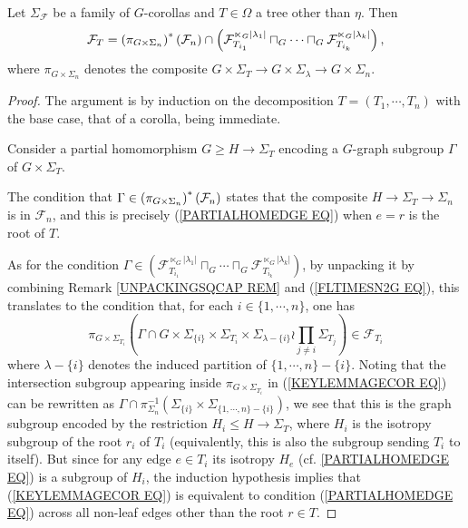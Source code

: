 \documentclass[a4paper,10pt]{article}%
\begin{document}
\begin{lemma}\label{KEYLEMMAGECO LEM}
  Let $\Sigma_\mathcal{F}$ be a family of $G$-corollas and 
  $T \in \Omega$ a tree other than $\eta$. Then
  \begin{equation}\label{KEYLEMMAGECO EQ}
    \mathcal{F}_T =
    \left(\pi_{G \times \Sigma_n}\right)^{\**}(\mathcal{F}_n)
    \cap
    \left(
      \mathcal{F}_{T_{i_1}}^{\ltimes_G |\lambda_1|}
      \sqcap_G \cdots \sqcap_G
      \mathcal{F}_{T_{i_k}}^{\ltimes_G |\lambda_k|}
    \right),
  \end{equation}
  where $\pi_{G \times \Sigma_n}$ denotes the composite
  $G \times \Sigma_T \to G \times \Sigma_{\lambda} \to
  G \times \Sigma_n$.
\end{lemma}

\begin{proof} The argument is by induction on the decomposition $T=(T_1,\cdots,T_n)$ with the base case, that of a corolla, being immediate.

  Consider a partial homomorphism $G \geq H \to \Sigma_T$ encoding a 
  $G$-graph subgroup $\Gamma$ of $G \times \Sigma_T$.
  
  The condition that $\Gamma \in \left(\pi_{G \times \Sigma_n}\right)^{\**}(\mathcal{F}_n)$ states that the composite $H \to \Sigma_T \to \Sigma_n$ is in $\mathcal{F}_n$, 
  and this is precisely (\ref{PARTIALHOMEDGE EQ}) when $e=r$ is the root of $T$.
  
  As for the condition 
  $ \Gamma \in 
  \left(
    \mathcal{F}_{T_{i_1}}^{\ltimes_G |\lambda_1|}
    \sqcap_G \cdots \sqcap_G
    \mathcal{F}_{T_{i_k}}^{\ltimes_G |\lambda_k|}
  \right)	$, by unpacking it by combining 
  Remark \ref{UNPACKINGSQCAP REM} and 
  (\ref{FLTIMESN2G EQ}), this translates to the condition that, for each $i \in \{1,\cdots,n\}$, one has
  \begin{equation}\label{KEYLEMMAGECOR EQ}
    \pi_{G \times \Sigma_{T_i}}
    \left(
      \Gamma \cap 
      G \times \Sigma_{\{i\}} \times \Sigma_{T_i}
      \times 
      \Sigma_{\lambda-\{i\}} \wr \prod_{j\neq i} \Sigma_{T_j}
    \right)	
    \in \mathcal{F}_{T_i}
  \end{equation}
  where $\lambda - \{i\}$ denotes the induced partition of 
  $\{1,\cdots,n\} - \{i\}$. Noting that the intersection subgroup appearing inside $\pi_{G \times \Sigma_{T_i}}$ in (\ref{KEYLEMMAGECOR EQ}) can be rewritten as 
  $\Gamma \cap \pi_{\Sigma_n}^{-1}
  (\Sigma_{\{i\}} \times \Sigma_{\{1,\cdots,n\} - \{i\}})$,
  we see that this is the graph subgroup encoded by the restriction $H_i \leq H \to \Sigma_T$, where $H_i$ is the isotropy subgroup of the root $r_i$ of $T_i$ (equivalently, this is also the subgroup sending $T_i$ to itself).
  But since for any edge $e \in T_i$ its isotropy $H_e$ 
  (cf. \ref{PARTIALHOMEDGE EQ}) is a subgroup of $H_i$, the induction hypothesis implies that (\ref{KEYLEMMAGECOR EQ})
  is equivalent to condition (\ref{PARTIALHOMEDGE EQ}) 
  across all non-leaf edges other than the root $r \in T$.


\end{proof}
\end{document}
